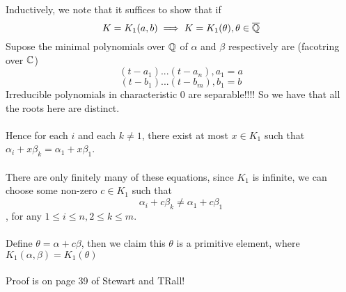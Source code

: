 \begin{remark}
Inductively, we note that it suffices to show that if
\[K = K_1(a, b) \implies K = K_1(\theta), \theta \in \overline{\mathbb{Q}}\]
Supose the minimal polynomials over $\mathbb{Q}$ of $\alpha$ and $\beta$ respectively are (facotring over $\mathbb{C}$)
\[(t - a_1)...(t - a_n), a_1 = a\]
\[(t - b_1)...(t - b_m), b_1 = b\]
Irreducible polynomials in characteristic 0 are separable!!!! So we have that all the roots here are distinct.\\\\
Hence for each $i$ and each $k \neq 1$, there exist at most $x \in K_1$ such that $\alpha_i + x\beta_k = \alpha_1 + x\beta_1$.\\\\
There are only finitely many of these equations, since $K_1$ is infinite, we can choose some non-zero $c \in K_1$ such that
\[\alpha_i + c\beta_k \neq \alpha_1 + c\beta_1\]
, for any $1 \leq i \leq n, 2 \leq k \leq m$.\\\\
Define $\theta = \alpha + c \beta$, then we claim this $\theta$ is a primitive element, where $K_1(\alpha, \beta) = K_1(\theta)$\\\\
Proof is on page 39 of Stewart and TRall!
\end{remark}